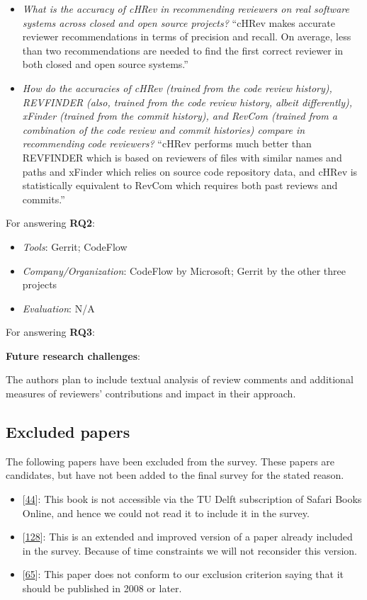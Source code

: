 \documentclass[]{book}
\providecommand{\tightlist}{%
  \setlength{\itemsep}{0pt}\setlength{\parskip}{0pt}}
\begin{document}
\begin{itemize}
\item
  \emph{What is the accuracy of cHRev in recommending reviewers on real
  software systems across closed and open source projects?} ``cHRev
  makes accurate reviewer recommendations in terms of precision and
  recall. On average, less than two recommendations are needed to find
  the first correct reviewer in both closed and open source systems.''
\item
  \emph{How do the accuracies of cHRev (trained from the code review
  history), REVFINDER (also, trained from the code review history,
  albeit differently), xFinder (trained from the commit history), and
  RevCom (trained from a combination of the code review and commit
  histories) compare in recommending code reviewers?} ``cHRev performs
  much better than REVFINDER which is based on reviewers of files with
  similar names and paths and xFinder which relies on source code
  repository data, and cHRev is statistically equivalent to RevCom which
  requires both past reviews and commits.''
\end{itemize}

For answering \textbf{RQ2}:

\begin{itemize}
\tightlist
\item
  \emph{Tools}: Gerrit; CodeFlow
\item
  \emph{Company/Organization}: CodeFlow by Microsoft; Gerrit by the
  other three projects
\item
  \emph{Evaluation}: N/A
\end{itemize}

For answering \textbf{RQ3}:

\textbf{Future research challenges}:

The authors plan to include textual analysis of review comments and
additional measures of reviewers' contributions and impact in their
approach.

\subsection{Excluded papers}\label{excluded-papers}

The following papers have been excluded from the survey. These papers
are candidates, but have not been added to the final survey for the
stated reason.

\begin{itemize}
\tightlist
\item
  {[}\protect\hyperlink{ref-cohen2010modern}{44}{]}: This book is not
  accessible via the TU Delft subscription of Safari Books Online, and
  hence we could not read it to include it in the survey.
\item
  {[}\protect\hyperlink{ref-mcintosh2016empirical}{128}{]}: This is an
  extended and improved version of a paper already included in the
  survey. Because of time constraints we will not reconsider this
  version.
\item
  {[}\protect\hyperlink{ref-fagan2002design}{65}{]}: This paper does not
  conform to our exclusion criterion saying that it should be published
  in 2008 or later.
\end{itemize}
\end{document}
